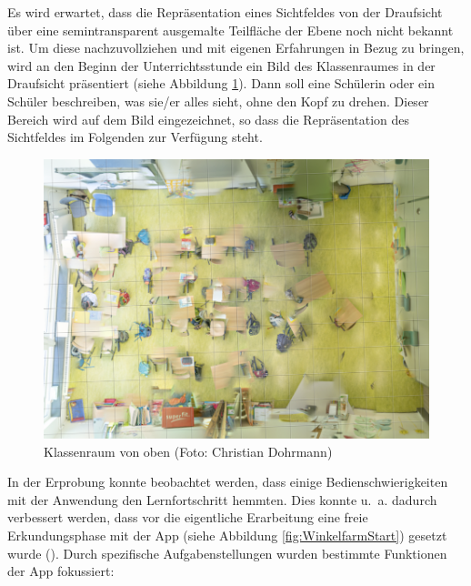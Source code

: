 \documentclass[
]{scrbook}
\theoremstyle{definition}
\theoremstyle{definition}
\theoremstyle{definition}
\theoremstyle{definition}
\theoremstyle{remark}
\begin{document}
Es wird erwartet, dass die Repräsentation eines Sichtfeldes von der Draufsicht über eine semintransparent ausgemalte Teilfläche der Ebene noch nicht bekannt ist. Um diese nachzuvollziehen und mit eigenen Erfahrungen in Bezug zu bringen, wird an den Beginn der Unterrichtsstunde ein Bild des Klassenraumes in der Draufsicht präsentiert (siehe Abbildung \ref{fig:Klassenraum}). Dann soll eine Schülerin oder ein Schüler beschreiben, was sie/er alles sieht, ohne den Kopf zu drehen. Dieser Bereich wird auf dem Bild eingezeichnet, so dass die Repräsentation des Sichtfeldes im Folgenden zur Verfügung steht.

\begin{figure}

{\centering \includegraphics[width=0.75\linewidth]{pictures/1-Klassenraum} 

}

\caption{Klassenraum von oben (Foto: Christian Dohrmann)}\label{fig:Klassenraum}
\end{figure}

In der Erprobung konnte beobachtet werden, dass einige Bedienschwierigkeiten mit der Anwendung den Lernfortschritt hemmten. Dies konnte u.~a. dadurch verbessert werden, dass vor die eigentliche Erarbeitung eine freie Erkundungsphase mit der App (siehe Abbildung \ref{fig:WinkelfarmStart}) gesetzt wurde (). Durch spezifische Aufgabenstellungen wurden bestimmte Funktionen der App fokussiert:
\end{document}
